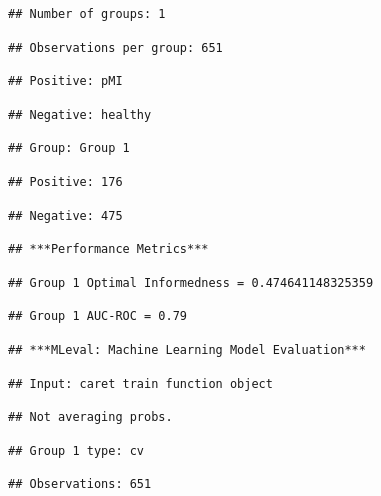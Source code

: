 \documentclass[
]{article}
\begin{document}
\begin{verbatim}
## Number of groups: 1
\end{verbatim}

\begin{verbatim}
## Observations per group: 651
\end{verbatim}

\begin{verbatim}
## Positive: pMI
\end{verbatim}

\begin{verbatim}
## Negative: healthy
\end{verbatim}

\begin{verbatim}
## Group: Group 1
\end{verbatim}

\begin{verbatim}
## Positive: 176
\end{verbatim}

\begin{verbatim}
## Negative: 475
\end{verbatim}

\begin{verbatim}
## ***Performance Metrics***
\end{verbatim}

\begin{verbatim}
## Group 1 Optimal Informedness = 0.474641148325359
\end{verbatim}

\begin{verbatim}
## Group 1 AUC-ROC = 0.79
\end{verbatim}

\begin{verbatim}
## ***MLeval: Machine Learning Model Evaluation***
\end{verbatim}

\begin{verbatim}
## Input: caret train function object
\end{verbatim}

\begin{verbatim}
## Not averaging probs.
\end{verbatim}

\begin{verbatim}
## Group 1 type: cv
\end{verbatim}

\begin{verbatim}
## Observations: 651
\end{verbatim}
\end{document}
